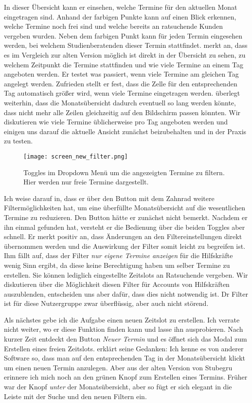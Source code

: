 In dieser Übersicht kann er einsehen, welche Termine für den aktuellen Monat
eingetragen sind. Anhand der farbigen Punkte kann \ipName auf einen Blick
erkennen, welche Termine noch frei sind und welche bereits an ratsuchende
Kunden vergeben wurden. Neben dem farbigen Punkt kann für jeden Termin
eingesehen werden, bei welchem Studienberatenden dieser Termin stattfindet.
\ipName merkt an, dass es im Vergleich zur alten Version möglich ist direkt in
der Übersicht zu sehen, zu welchem Zeitpunkt die Termine stattfinden und wie
viele Termine an einem Tag angeboten werden. Er testet was passiert, wenn viele
Termine am gleichen Tag angelegt werden. Zufrieden stellt er fest, dass die
Zelle für den entsprechenden Tag automatisch größer wird, wenn viele Termine
eingetragen werden. \ipName überlegt weiterhin, dass die Monatsübersicht
dadurch eventuell so lang werden könnte, dass nicht mehr alle Zeilen
gleichzeitig auf den Bildschirm passen könnten. Wir diskutieren wie viele
Termine üblicherweise pro Tag angeboten werden und einigen uns darauf die
aktuelle Ansicht zunächst beizubehalten und in der Praxis zu testen.

\begin{figure}[H]
    \caption{Toggles im Dropdown Menü um die angezeigten Termine zu filtern. Hier werden nur freie Termine dargestellt.}
    \centering
    \texttt{[image: screen\_new\_filter.png]}
\end{figure}

Ich weise \ipName darauf in, dass er über den Button mit dem Zahnrad weitere
Filtermöglichkeiten hat, um eine überfüllte Monatsübersicht auf die
wesentlichen Termine zu reduzieren. Den Button hätte er zunächst nicht bemerkt.
Nachdem er ihn einmal gefunden hat, versteht er die Bedienung über die beiden
Toggles aber schnell. Er merkt positiv an, dass Änderungen an den
Filtereinstellungen direkt übernommen werden und die Auswirkung der Filter
somit leicht zu begreifen ist. Ihm fällt auf, dass der Filter \textit{nur
    eigene Termine anzeigen} für die Hilfskräfte wenig Sinn ergibt, da diese keine
Berechtigung haben um selber Termine zu erstellen. Sie können lediglich
eingestellte Zeitslots an Ratsuchende vergeben. Wir diskutieren über die
Möglichkeit diesen Filter für Accounts von Hilfskräften auszublenden,
entscheiden uns aber dafür, dass dies nicht notwendig ist. Dr Filter ist für
diese Nutzergruppe zwar überflüssig, aber auch nicht störend.


Als nächstes gebe ich \ipName die Aufgabe einen neuen Zeitslot zu erstellen.
Ich verrate nicht weiter, wo er diese Funktion finden kann und lasse ihn
ausprobieren. Nach kurzer Zeit entdeckt \ipName den Button \textit{Neuer
    Termin} und es öffnet sich das Modal zum Erstellen eines freien Zeitslots.
\ipName erklärt seine Gedanken: \glqq{}Ich kenne es von anderer Software so,
dass man auf den entsprechenden Tag in der Monatsübersicht klickt um einen
neuen Termin anzulegen. Aber aus der alten Version von Stubegru erinnere ich
mich noch an den grünen Knopf zum Erstellen eines Termins. Früher war der Knopf
\textit{unter} der Monatsübersicht, aber so fügt er sich elegant in die Leiste
mit der Suche und den neuen Filtern ein.\grqq{}\cite{clavesUsertest}

